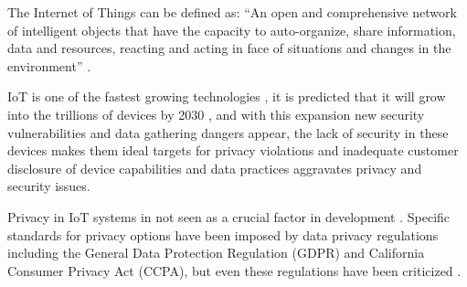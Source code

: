 \documentclass[conference]{IEEEtran}
\begin{document}

The Internet of Things can be defined as: ``An open and comprehensive network
of intelligent objects that have the capacity to auto-organize, share information,
data and resources, reacting and acting in face of situations and changes in
the environment'' \cite{madakam2015internet}.

IoT is one of the fastest growing technologies \cite{MohammadState}, it is
predicted that it will grow into the trillions of devices by 2030 \cite{SarawiInternet},
and with this expansion new security vulnerabilities and data gathering dangers
appear, the lack of security in these devices makes them ideal targets for privacy
violations and inadequate customer disclosure of device capabilities and data
practices aggravates privacy and security issues.

Privacy in IoT systems in not seen as a crucial factor in development \cite{alhirabi2021security}.
Specific standards for privacy options have been imposed by data privacy regulations
including the General Data Protection Regulation (GDPR) and California Consumer
Privacy Act (CCPA), but even these regulations have been criticized \cite{peloquin2020disruptive, gladis2022weaponizing, gentile2022deficient, green2022flaws, byun2019privacy}.
\end{document}
